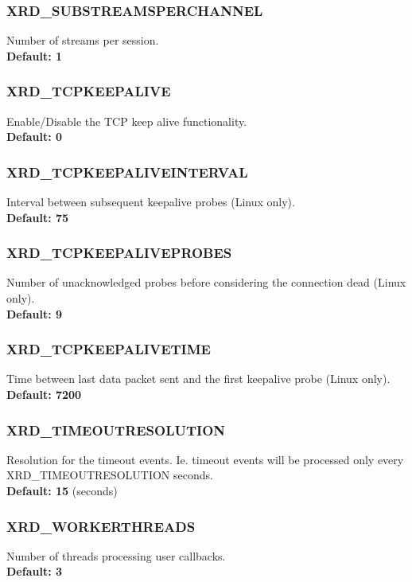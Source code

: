 \documentclass{article}
\begin{document}
		\subsubsection{XRD_SUBSTREAMSPERCHANNEL}
		\label{env:substreamsperchannel}
			Number of streams per session. \\
			\textbf{Default: 1}
			
		\subsubsection{XRD_TCPKEEPALIVE}
		\label{env:tcpkeepalive}
		    Enable/Disable the TCP keep alive functionality. \\
		    \textbf{Default: 0}
		    
		\subsubsection{XRD_TCPKEEPALIVEINTERVAL}
		\label{env:tcpkeepaliveinterval}
		    Interval between subsequent keepalive probes (Linux only). \\
		    \textbf{Default: 75}
		    
		\subsubsection{XRD_TCPKEEPALIVEPROBES}
		\label{env:tcpkeepaliveprobes}
		    Number of unacknowledged probes before considering the connection dead (Linux only). \\
		    \textbf{Default: 9}
		    
		\subsubsection{XRD_TCPKEEPALIVETIME}
		\label{env:tcpkeepalivetime}
		    Time between last data packet sent and the first keepalive probe (Linux only). \\
		    \textbf{Default: 7200}
		    
		\subsubsection{XRD_TIMEOUTRESOLUTION}
		\label{env:timeoutresolution}
		    Resolution for the timeout events. Ie. timeout events will be processed only every XRD_TIMEOUTRESOLUTION 
		    seconds. \\
		    \textbf{Default: 15} (seconds)
		
		\subsubsection{XRD_WORKERTHREADS}
		\label{env:workerthreads}
		    Number of threads processing user callbacks. \\
		    \textbf{Default: 3}
		
\end{document}
